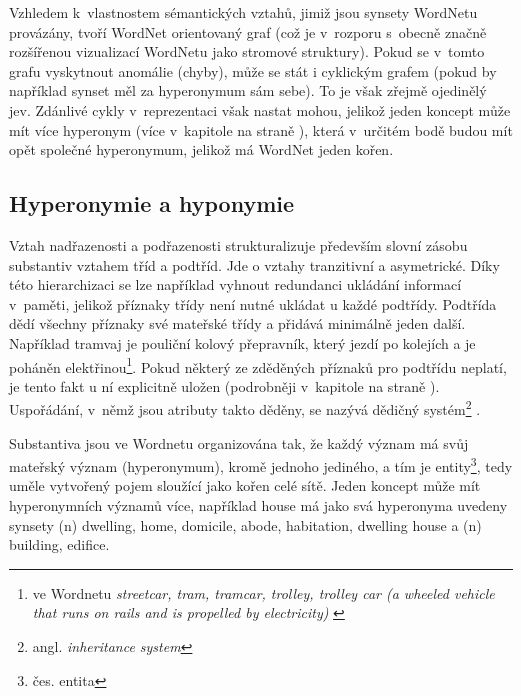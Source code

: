 \documentclass[a4paper, 11pt, oneside, showtrims]{book}
\newcommand{\itNameRef}[1]{\textit{\nameref{#1}}}
\newcommand\ex{\textsf}
\begin{document}
				Vzhledem k~vlastnostem sémantických vztahů, jimiž jsou synsety WordNetu provázány, tvoří WordNet orientovaný graf (což je v~rozporu s~obecně značně rozšířenou vizualizací WordNetu jako stromové struktury). Pokud se v~tomto grafu vyskytnout anomálie (chyby), může se stát i cyklickým grafem (pokud by například synset měl za hyperonymum sám sebe). To je však zřejmě ojedinělý jev. \parencite{richens2008anomalies} Zdánlivé cykly v~reprezentaci však nastat mohou, jelikož jeden koncept může mít více hyperonym (více v~kapitole \itNameRef{cha:hyperohyp} na straně \pageref{cha:hyperohyp}), která v~určitém bodě budou mít opět společné hyperonymum, jelikož má WordNet jeden kořen.


				
				\subsection{Hyperonymie a hyponymie}
				\label{cha:hyperohyp}

					Vztah nadřazenosti a podřazenosti strukturalizuje především slovní zásobu substantiv vztahem tříd a podtříd. Jde o vztahy tranzitivní a asymetrické. \parencite{miller1990introduction} Díky této hierarchizaci se lze například vyhnout redundanci ukládání informací v~paměti, jelikož příznaky třídy není nutné ukládat u každé podtřídy. Podtřída dědí všechny příznaky své mateřské třídy a přidává minimálně jeden další. Například \ex{tramvaj} je \ex{pouliční kolový přepravník, který jezdí po kolejích a je poháněn elektřinou}\footnote{ve Wordnetu \textit{streetcar, tram, tramcar, trolley, trolley car (a wheeled vehicle that runs on rails and is propelled by electricity)} \parencite{princetonWN}}. Pokud některý ze zděděných příznaků pro podtřídu neplatí, je tento fakt u ní explicitně uložen (podrobněji v~kapitole \itNameRef{cha:psycho} na straně \pageref{cha:psycho}). Uspořádání, v~němž jsou atributy takto děděny, se nazývá dědičný systém\footnote{angl. \textit{inheritance system}} \parencite{touretzky1986mathematics}.

					Substantiva jsou ve Wordnetu organizována tak, že každý význam má svůj mateřský význam (hyperonymum), kromě jednoho jediného, a tím je \ex{entity}\footnote{čes. \ex{entita}}, tedy uměle vytvořený pojem sloužící jako kořen celé sítě. Jeden koncept může mít hyperonymních významů více, například \ex{house} má jako svá hyperonyma uvedeny synsety \ex{(n) dwelling, home, domicile, abode, habitation, dwelling house} a \ex{(n) building, edifice}.
\end{document}
